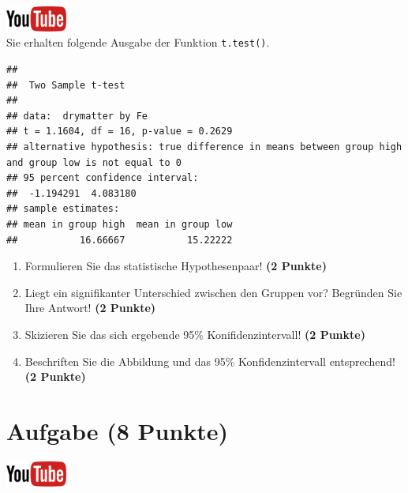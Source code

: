 \documentclass[a4paper, 10pt]{scrartcl}\usepackage[]{graphicx}\usepackage[]{xcolor}
\makeatletter
\newenvironment{kframe}{%
 \def\at@end@of@kframe{}%
 \ifinner\ifhmode%
  \def\at@end@of@kframe{\end{minipage}}%
  \begin{minipage}{\columnwidth}%
 \fi\fi%
 \def\FrameCommand##1{\hskip\@totalleftmargin \hskip-\fboxsep
 \colorbox{shadecolor}{##1}\hskip-\fboxsep
     \hskip-\linewidth \hskip-\@totalleftmargin \hskip\columnwidth}%
 \MakeFramed {\advance\hsize-\width
   \@totalleftmargin\z@ \linewidth\hsize
   \@setminipage}}%
 {\par\unskip\endMakeFramed%
 \at@end@of@kframe}
\newenvironment{knitrout}{}{} %
\makeatother
\begin{document}
\hfill\href{https://youtu.be/wJqsNV1hOW8}{\includegraphics[width =
  2cm]{img/youtube}}\\[1Ex]

Sie erhalten folgende \Rlogo Ausgabe der Funktion \texttt{t.test()}.

\begin{knitrout}
\color{fgcolor}\begin{kframe}
\begin{verbatim}
## 
## 	Two Sample t-test
## 
## data:  drymatter by Fe
## t = 1.1604, df = 16, p-value = 0.2629
## alternative hypothesis: true difference in means between group high and group low is not equal to 0
## 95 percent confidence interval:
##  -1.194291  4.083180
## sample estimates:
## mean in group high  mean in group low 
##           16.66667           15.22222
\end{verbatim}
\end{kframe}
\end{knitrout}


\begin{enumerate}
  \item Formulieren Sie das statistische Hypothesenpaar! \textbf{(2
Punkte)}
\item Liegt ein signifikanter Unterschied zwischen den Gruppen vor?
  Begr{\"u}nden Sie Ihre Antwort! \textbf{(2 Punkte)}
\item Skizieren Sie das sich ergebende 95\% Konifidenzintervall! \textbf{(2 Punkte)}
\item Beschriften Sie die Abbildung und
  das 95\% Konfidenzintervall entsprechend! \textbf{(2 Punkte)}  
\end{enumerate} 
\clearpage

\section{Aufgabe \hfill (8 Punkte)}

\hfill\href{https://youtu.be/w62HJlbN28U}{\includegraphics[width =
  2cm]{img/youtube}}\\[1Ex]
\end{document}
